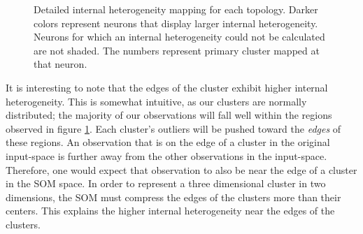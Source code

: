 \begin{figure}[htb]
\centering
\begin{minipage}{\textwidth}
\caption{Detailed internal heterogeneity mapping for each topology. Darker colors
represent neurons that display larger internal heterogeneity. Neurons for which
an internal heterogeneity could not be calculated are not shaded. The numbers
represent primary cluster mapped at that neuron.}
\label{cluster}
\end{minipage}
\end{figure}

It is interesting to note that the edges of the cluster exhibit higher internal heterogeneity.  
This is somewhat intuitive, as our clusters are normally distributed; the
majority of our observations will fall well within the regions observed in
figure \ref{cluster}. Each cluster's outliers will be pushed toward the
\emph{edges} of these regions. An observation that is on the edge of a cluster
in the original input-space is further away from the other observations in the
input-space.  Therefore, one would expect that observation to also be near the
edge of a cluster in the SOM space.  In order to represent a three dimensional
cluster in two dimensions, the SOM must compress the edges of the clusters
more than their centers.  This explains the higher internal heterogeneity near
the edges of the clusters. 




